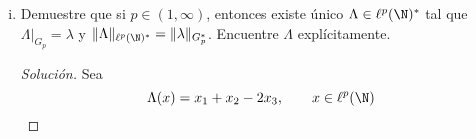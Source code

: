 \documentclass[duedate = 11 de Septiembre, 
			ramo = An\'alisis Funcional, 
			doctype = Tarea 1,
			semester = 2,
			year = 2017]{tarea}
\begin{document}
\begin{enumerate}[(i)]
\begin{proof}[Solución]
	Sea $x_{0} = (1,1,-1,0,\ldots) \in G_{\infty}$ y con $\|x_{0}\|_{\ell^{\infty}(\N)} = 1$. Tenemos que
		$$|\lambda(x_{0})| = |4| = 4$$

	por lo que $\|\lambda\|_{G_{\infty}^{*}} = 4$.	\\
	
	Ahora, sean $p \in (1,\infty)$ y $x \in G_{p}$ con $\|x\|_{\ell^{p}(\N)} = 1$. Para tener igualdad entre $\|\lambda\|_{G_{p}^{*}}$ y $\|f_{0}\|_{\ell^{p'}(\N)}$ debe darse la igualdad en H\"older, lo que ocurre si y solo si existe $\beta \geq 0$ tal que
		\[ |x_{j}|^{p} = \beta |(f_{0})_{j}|^{p'} \qquad j = 1,2,3	\tag{4,2} \]
	
	Sumando sobre $j$ tenemos que
		$$1 = \beta \sum_{j=1}^{3} |(f_{0})_{j}|^{p'} = \beta \|f_{0}\|_{\ell^{p'}(\N)}^{p'}$$
	
	de donde 
		$$\beta = \| f_{0}\|_{\ell^{p'}(\N)}^{-p'} = \left( 1 + 1 + 2^{p'} \right)^{-1} = \left(2 + 2^{p'}\right)^{-1}$$.
	
	Luego, tomando
		$$x_{0} = \beta^{1/p} ( 1, 1, -2^{p'/p}, 0, \ldots ) = \beta^{1/p} \Big( (f_{0})_{1}^{p'/p} , (f_{0})_{2}^{p'/p}, -(-f_{0})_{3}^{p'/p} \Big) $$
	
	se tiene por construcción que $\|x_{0}\|_{\ell^{p}(\N)} = 1$ (pues se verifica (4.2)), $x_{0} \in G_{p}$ y usando que $\frac{1}{p} + \frac{1}{p'} = 1$ implica $p' + p = pp'$,
		\begin{align*}
			\lambda(x_{0})
				&=	\beta^{1/p} \left( 2 + 2^{\frac{p'}{p} + 1} \right)	\\
				&=	\beta^{1/p} \left(2 + 2^{\frac{p' +p}{p}} \right)	\\
				&=	\beta^{1/p} \left(2 + 2^{\frac{p'p}{p}} \right)	\\
				&=	\beta^{1/p}\beta^{-1}	\\
				&=	\beta^{-1/p'}	\\
				&=	\|f_{0}\|_{\ell^{p'}(\N)}
		\end{align*}
	
	por lo que $\|\lambda\|_{G_{p}^{*}} = \|f_{0}\|_{\ell^{p'}(\N)}$.
	\end{proof}
	
	\newpage
	\item Demuestre que si $p \in (1,\infty)$, entonces existe único $\Lambda \in \ell^{p}(\N)^{*}$ tal que $\Lambda \big|_{G_{p}}= \lambda$ y $\|\Lambda\|_{\ell^{p}(\N)^{*}} = \|\lambda\|_{G_{p}^{*}}$. Encuentre $\Lambda$ explícitamente.
	
	\begin{proof}[Solución] Sea
		$$\Lambda(x) = x_{1} + x_{2} - 2x_{3}, \qquad x \in \ell^{p}(\N)$$
	

\end{proof}
\end{enumerate}
\end{document}
